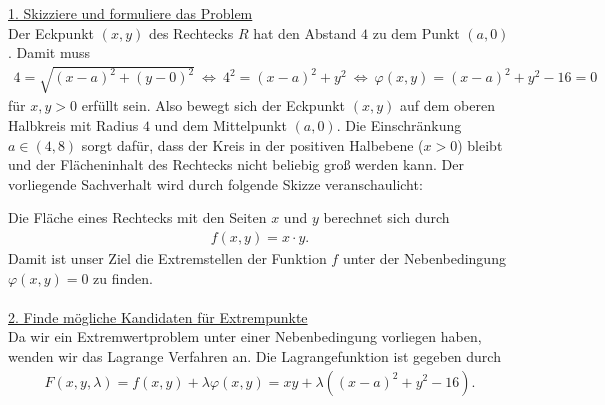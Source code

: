 \underline{1. Skizziere und formuliere das Problem}\\
Der Eckpunkt $ (x,y) $ des Rechtecks $ R $ hat den Abstand $ 4  $ zu dem Punkt $ (a,0) $. Damit muss
\begin{align*}
4 = \sqrt{(x-a)^2 + (y-0)^2}  \ \Leftrightarrow \ 4^2 = (x-a)^2 + y^2
\ \Leftrightarrow \ 
\varphi(x,y) = (x-a)^2  +y^2 -16 = 0
\end{align*}
für $ x,y  > 0  $ erfüllt sein. Also bewegt sich der Eckpunkt $ (x,y) $ auf dem oberen Halbkreis mit Radius $ 4 $ und dem Mittelpunkt $ (a,0) $.
Die Einschränkung $ a \in (4,8) $ sorgt dafür, dass der Kreis in der positiven Halbebene ($ x > 0 $) bleibt und der Flächeninhalt des Rechtecks nicht beliebig groß werden kann.
Der vorliegende Sachverhalt wird durch folgende Skizze veranschaulicht:
\begin{center}
\end{center}
Die Fläche eines Rechtecks mit den Seiten $ x $ und $ y $ berechnet sich durch
\begin{align*}
f(x,y) = x \cdot y.
\end{align*}
Damit ist unser Ziel die Extremstellen der Funktion $ f $ unter der Nebenbedingung $ \varphi(x,y) = 0 $ zu finden.\\
\\
\underline{2. Finde mögliche Kandidaten für Extrempunkte}\\
Da wir ein Extremwertproblem unter einer Nebenbedingung vorliegen haben, wenden wir das Lagrange Verfahren an. Die Lagrangefunktion ist gegeben durch
\begin{align*}
F(x,y,\lambda) = 
f(x,y) + \lambda \varphi(x,y) = xy + \lambda ( (x-a)^2 + y^2 -16 ). 
\end{align*}
